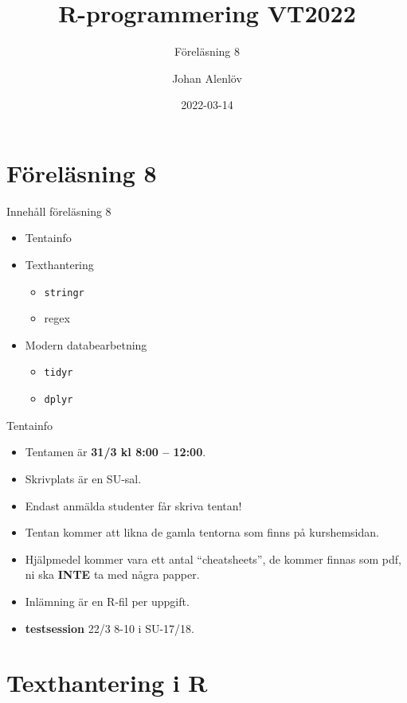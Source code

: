 \documentclass[
  11pt,
  ignorenonframetext,
  handout]{beamer}
\title{R-programmering VT2022}
\subtitle{Föreläsning 8}
\author{Johan Alenlöv}
\date{2022-03-14}
\institute{Linköpings Universitet}
\providecommand{\tightlist}{%
  \setlength{\itemsep}{0pt}\setlength{\parskip}{0pt}}
\begin{document}
\frame{\titlepage}

\hypertarget{fuxf6reluxe4sning-8}{%
\section{Föreläsning 8}\label{fuxf6reluxe4sning-8}}

\begin{frame}{Innehåll föreläsning 8}
\protect\hypertarget{innehuxe5ll-fuxf6reluxe4sning-8}{}
\begin{itemize}
\tightlist
\item
  Tentainfo
\item
  Texthantering

  \begin{itemize}
  \tightlist
  \item
    \texttt{stringr}
  \item
    regex
  \end{itemize}
\item
  Modern databearbetning

  \begin{itemize}
  \tightlist
  \item
    \texttt{tidyr}
  \item
    \texttt{dplyr}
  \end{itemize}
\end{itemize}
\end{frame}

\begin{frame}{Tentainfo}
\protect\hypertarget{tentainfo}{}
\begin{itemize}
\tightlist
\item
  Tentamen är \textbf{31/3 kl 8:00 -- 12:00}.
\item
  Skrivplats är en SU-sal.
\item
  Endast anmälda studenter får skriva tentan!
\item
  Tentan kommer att likna de gamla tentorna som finns på kurshemsidan.
\item
  Hjälpmedel kommer vara ett antal ``cheatsheets'', de kommer finnas som
  pdf, ni ska \textbf{INTE} ta med några papper.
\item
  Inlämning är en R-fil per uppgift.
\item
  \textbf{testsession} 22/3 8-10 i SU-17/18.
\end{itemize}
\end{frame}

\hypertarget{texthantering-i-r}{%
\section{Texthantering i R}\label{texthantering-i-r}}
\end{document}
